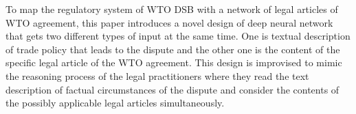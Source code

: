 To map the regulatory system of WTO DSB with a network of legal articles of WTO agreement,
this paper introduces a novel design of deep neural network \citep{DBLP:journals/corr/Schmidhuber14} that
gets two different types of input at the same time.
One is textual description of trade policy that leads to the dispute and
the other one is the content of the specific legal article of the WTO agreement.
This design is improvised to mimic
the reasoning process of the legal practitioners
where they read
the text description of
factual circumstances of the dispute and consider the contents of
the possibly applicable legal articles simultaneously.

 
 
 
 
 
 

